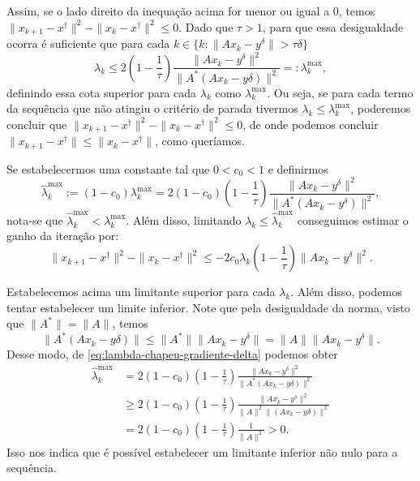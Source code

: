 Assim, se o lado direito da inequação acima for menor ou igual a $0$, temos  $\| x_{k+1} - x^\dag\|^2 - \|x_k - x^\dag \|^2\leq 0$. Dado que $\tau>1$, para que essa desigualdade ocorra é suficiente que para cada $k \in\{k:\|Ax_k-y^\delta \|>\tau \delta\}$
\begin{equation}\label{eq:estimativa-ganho-gradiente-delta}
\lambda_k \leq 2 (1 - \frac 1 \tau) \frac{ \| Ax_k - y^\delta \|^2}{\| A^*(Ax_k - y\delta)\|^2} =: \lambda_k^{\max},
\end{equation}
definindo essa cota superior para cada $\lambda_k$ como $\lambda_k^{\max}$. Ou seja, se para cada termo da sequência que não atingiu o critério de parada tivermos $\lambda_k \leq \lambda_k^{\max}$, poderemos concluir que $\| x_{k+1} - x^\dag\|^2 - \|x_k - x^\dag \|^2\leq 0$, de onde podemos concluir $\| x_{k+1} - x^\dag\| \leq \|x_k - x^\dag \|$, como queríamos.

Se estabelecermos uma constante tal que $0<c_0<1$ e definirmos
\begin{equation}\label{eq:lambda-chapeu-gradiente-delta}
    {\hat \lambda_k^{\max}} := (1-c_0) \lambda_k^{\max} = 2 (1-c_0)(1 - \frac 1 \tau) \frac{ \| Ax_k - y^\delta \|^2}{\| A^*(Ax_k - y^\delta)\|^2},
\end{equation}
nota-se que $\hat \lambda_k^{\max}< \lambda_k^{\max}$. Além disso, limitando $\lambda_k\leq \hat\lambda_k^{\max}$ conseguimos estimar o ganho da iteração por:
\begin{equation}\label{eq:ganho-gradiente-delta}
    \|x_{k+1}-x^\dag\|^2 - \| x_k - x^\dag\|^2 \leq -2c_0\lambda_k(1-\frac 1 \tau) \|Ax_k - y^\delta \|^2.
\end{equation}

Estabelecemos acima um limitante superior para cada $\lambda_k$. Além disso, podemos tentar estabelecer um limite inferior. Note que pela desigualdade da norma, visto que $\|A^*\| = \|A\|$, temos 
\[
\|A^*(Ax_k-y\delta)\|\leq \|A^*\|\| Ax_k - y^\delta\|=\|A\|\| Ax_k - y^\delta\|.
\]
Desse modo, de \eqref{eq:lambda-chapeu-gradiente-delta} podemos obter 
\begin{align*}
{\hat \lambda_k^{\max}} &= 2 (1-c_0)(1 - \frac 1 \tau) \frac{ \| Ax_k - y^\delta \|^2}{\| A^*(Ax_k - y\delta)\|^2} \\
&\geq
2 (1-c_0)(1 - \frac 1 \tau) \frac{ \| Ax_k - y^\delta \|^2}{\|A\|^2 \|(Ax_k - y\delta)\|^2}  \\
&= 2 (1-c_0)(1 - \frac 1 \tau) \frac{1}{\|A\|^2}>0.
\end{align*}
Isso nos indica que é possível estabelecer um limitante inferior não nulo para a sequência.

